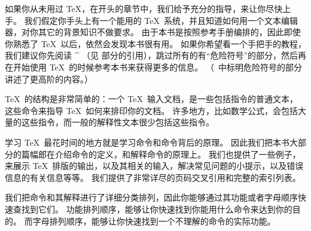 如果你从未用过 \TeX，在开头的章节中，我们给予充分的指导，来让你尽快上手。
我们假定你手头上有一个能用的 \TeX\ 系统，并且知道如何用一个文本编辑器，对你其它的背景知识不做要求。
由于本书是按照参考手册编排的，因此即使你熟悉了 \TeX\ 以后，依然会发现本书很有用。
如果你希望看一个手把手的教程，我们建议你先阅读 ^{\texbook} （见  部分的引用），跳过所有的有“危险符号”的部分，然后再在开始使用 \TeX\ 的时候参考本书来获得更多的信息。
（\texbook\ 中标明危险符号的部分讲述了更高阶的内容。）


\TeX\ 的结构是非常简单的：一个 \TeX\ 输入文档，是一些包括指令的普通文本，
这些命令来指导 \TeX\ 如何来排印你的文档。
许多地方，比如数学公式，会包括大量的这些指令，而一般的解释性文本很少包括这些指令。


学习 \TeX\ 最花时间的地方就是学习命令和命令背后的原理。
因此我们把本书大部分的篇幅郎在介绍命令的定义，和解释命令的原理上。
我们也提供了一些例子，来展示 \TeX\ 排版的输出，以及其相关的输入，解决常见问题的小提示，以及错误信息的有关信息等等。
我们提供了非常详尽的页码交叉引用和完整的索引列表。



我们把命令和其解释进行了详细分类排列，因此你能够通过其功能或者字母顺序快速查找到它们。
功能排列顺序，能够让你快速找到你能用什么命令来达到你的目的。
而字母排列顺序，能够让你快速找到一个不理解的命令的实际功能。



